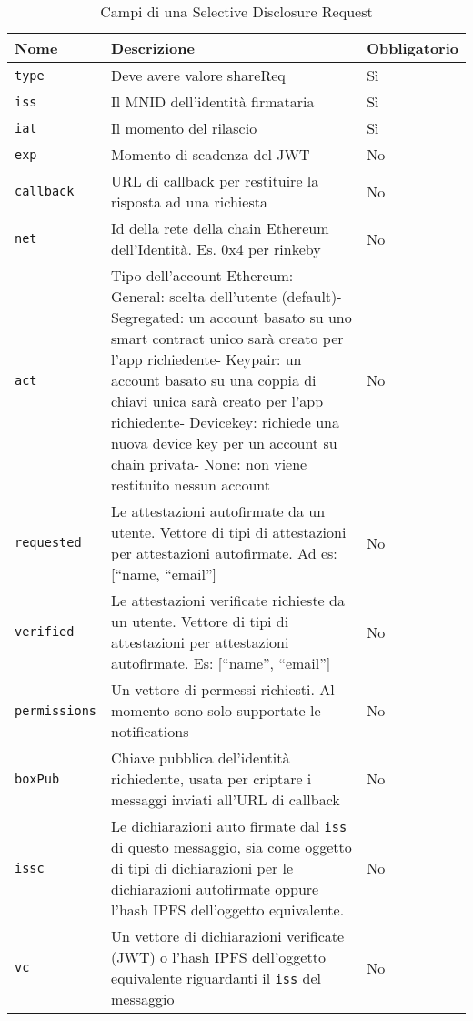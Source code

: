 \begin{table}[htbp]
    \centering
    \caption{Campi di una Selective Disclosure Request}
      \begin{tabular}{p{6.165em}p{19.89em}p{6.335em}}
      \toprule
      \textbf{Nome} & \textbf{Descrizione} & \textbf{Obbligatorio} \\
      \midrule
      \texttt{type} & Deve avere valore shareReq & Sì \\
      \midrule
      \texttt{iss} & Il MNID dell’identità firmataria & Sì \\
      \midrule
      \texttt{iat} & Il momento del rilascio & Sì \\
      \midrule
      \texttt{exp} & Momento di scadenza del JWT & No \\
      \midrule
      \texttt{callback} & URL di callback per restituire la risposta ad una richiesta & No \\
      \midrule
      \texttt{net} & Id della rete della chain Ethereum dell’Identità. Es. 0x4 per rinkeby & No \\
      \midrule
      \texttt{act} & Tipo dell’account Ethereum: \newline{}- General: scelta dell’utente (default)\newline{}- Segregated: un account basato su uno smart contract unico sarà creato per l’app richiedente\newline{}- Keypair: un account basato su una coppia di chiavi unica sarà creato per l’app richiedente\newline{}- Devicekey: richiede una nuova device key per un account su chain privata\newline{}- None: non viene restituito nessun account & No \\
      \midrule
      \texttt{requested} & Le attestazioni autofirmate da un utente. Vettore di tipi di attestazioni\newline{} per attestazioni autofirmate. Ad es: [“name, “email”] & No \\
      \midrule
      \texttt{verified} & Le attestazioni verificate richieste da un utente. Vettore di tipi di attestazioni per attestazioni autofirmate. Es: [“name”, “email”] & No \\
      \midrule
      \texttt{permissions} & Un vettore di permessi richiesti. Al momento sono solo supportate le notifications & No \\
      \midrule
      \texttt{boxPub} & Chiave pubblica del'identità richiedente, usata per criptare i messaggi inviati all'URL di callback & No \\
      \midrule
      \newpage
      \texttt{issc} & Le dichiarazioni auto firmate dal \texttt{iss} di questo messaggio, sia come oggetto di tipi di dichiarazioni
      per le dichiarazioni autofirmate oppure l'hash IPFS dell'oggetto equivalente. & No \\
      \midrule
      \texttt{vc} & Un vettore di dichiarazioni verificate (JWT) o l'hash IPFS dell'oggetto equivalente riguardanti
      il \texttt{iss} del messaggio  & No \\
      \bottomrule
      \end{tabular}%
    \label{tab:selectivedisclosurerequest}%
  \end{table}%

